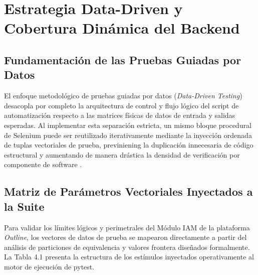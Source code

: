 \documentclass[12pt,oneside]{report}
\begin{document}
\chapter{Estrategia Data-Driven y Cobertura Dinámica del Backend}

\section{Fundamentación de las Pruebas Guiadas por Datos}
El enfoque metodológico de pruebas guiadas por datos (\textit{Data-Driven Testing}) desacopla por completo la arquitectura de control y flujo lógico del script de automatización respecto a las matrices físicas de datos de entrada y salidas esperadas. Al implementar esta separación estricta, un mismo bloque procedural de Selenium puede ser reutilizado iterativamente mediante la inyección ordenada de tuplas vectoriales de prueba, previniening la duplicación innecesaria de código estructural y aumentando de manera drástica la densidad de verificación por componente de software \parencite{jorgensen2022}.

\section{Matriz de Parámetros Vectoriales Inyectados a la Suite}
Para validar los límites lógicos y perimetrales del Módulo IAM de la plataforma \textit{Outline}, los vectores de datos de prueba se mapearon directamente a partir del análisis de particiones de equivalencia y valores frontera diseñados formalmente. La Tabla 4.1 presenta la estructura de los estímulos inyectados operativamente al motor de ejecución de pytest.
\end{document}

